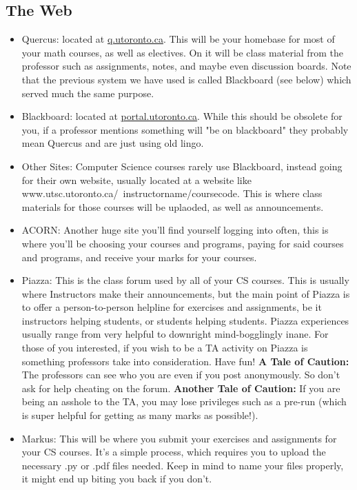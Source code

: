 \documentclass[11pt]{article}
\begin{document}
\subsection{The Web}
\begin{itemize}

\item Quercus: located at \url{q.utoronto.ca}. This will be your homebase for most of your math courses, as well as electives. On it will be class material from the professor such as assignments, notes, and maybe even discussion boards. Note that the previous system we have used is called Blackboard (see below) which served much the same purpose.
\item Blackboard: located at \url{portal.utoronto.ca}. While this should be obsolete for you, if a professor mentions something will "be on blackboard" they probably mean Quercus and are just using old lingo.
\item Other Sites: Computer Science courses rarely use Blackboard, instead going for their own website, usually located at a website like www.utsc.utoronto.ca/~instructorname/coursecode. This is where class materials for those courses will be uplaoded, as well as announcements.
\item ACORN: Another huge site you'll find yourself logging into often, this is where you'll be choosing your courses and programs, paying for said courses and programs, and receive your marks for your courses.
\item Piazza: This is the class forum used by all of your CS courses. This is usually where Instructors make their announcements, but the main point of Piazza is to offer a person-to-person helpline for exercises and assignments, be it instructors helping students, or students helping students. Piazza experiences usually range from very helpful to downright mind-bogglingly inane. For those of you interested, if you wish to be a TA activity on Piazza is something professors take into consideration. Have fun! \textbf{A Tale of Caution:} The professors can see who you are even if you post anonymously. So don't ask for help cheating on the forum. \textbf{Another Tale of Caution:} If you are being an asshole to the TA, you may lose privileges such as a pre-run (which is super helpful for getting as many marks as possible!).
\item Markus: This will be where you submit your exercises and assignments for your CS courses. It's a simple process, which requires you to upload the necessary .py or .pdf files needed. Keep in mind to name your files properly, it might end up biting you back if you don't.
 
\end{itemize}
\end{document}
